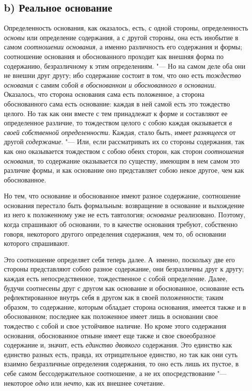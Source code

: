 \subsection[b) Реальное основание]{b) Реальное основание}
Определенность основания, как оказалось, есть, с
одной стороны, определенность {\em основы} или
определение содержания, а с другой стороны, она есть инобытие в самом
{\em соотношении основания}, а именно различность его
содержания и формы; соотношение основания и обоснованного проходит как
внешняя форма по содержанию, безразличному к этим определениям. "--- Но на
самом деле оба они не внешни друг другу; ибо содержание состоит в том, что
оно есть {\em тождество основания} с самим собой
{\em в обоснованном и обоснованного в основании}.
Оказалось, что сторона основания сама есть положенное, а сторона
обоснованного сама есть основание: каждая в ней самой есть это тождество
целого. Но так как они вместе с тем принадлежат к форме и составляют ее
определенное различие, то тождеством целого с собою каждая оказывается
{\em в своей собственной
определенности}.
Каждая, стало быть, имеет {\em разнящееся} от другой
{\em содержание}. "--- Или, если рассматривать их со
стороны содержания, так как оно оказывается тождеством с собою обеих
сторон, как сторон {\em соотношения основания}, то
содержание оказывается по существу, имеющим в нем самом это различие формы,
и как основание оно представляет собою некое другое, чем как обоснованное.

Но тем, что основание и обоснованное имеют разное содержание, соотношение
основания перестало быть формальным: возвращение в основание и выхождение
из него к положенному уже не есть тавтология;
{\em основание} реализовано. Поэтому, когда спрашивают
об основании, то в качестве основания требуют, собственно говоря,
некоторого другого определения содержания, чем то, об основании которого
спрашивают.

Это соотношение определяет себя теперь далее. А~именно, поскольку две его
стороны представляют собою разное содержание, они безразличны друг к другу;
каждая есть непосредственное, тождественное с собой определение. Далее,
будучи соотнесены друг с другом как основание и обоснованное, основание
есть рефлектированное внутрь себя в другом как в своей положенности; таким
образом, то содержание, которым обладает сторона основания, имеется также и
в обоснованном; последнее как положенное имеет лишь в основании свое
тождество с собой и свое устойчивое наличие. Но кроме этого содержания
основания, обоснованное отныне имеет еще также и свое своеобразное
содержание и, значит, есть {\em единство двоякого}
содержания. Это единство как единство разных есть, правда, их отрицательное
единство, но так как они суть взаимно безразличные определения содержания,
то оно есть лишь их пустое, в себе самом бессодержательное соотношение, а
не их опосредствование "--- некоторое {\em одно} или
{\em нечто}, как их внешнее сочетание.

